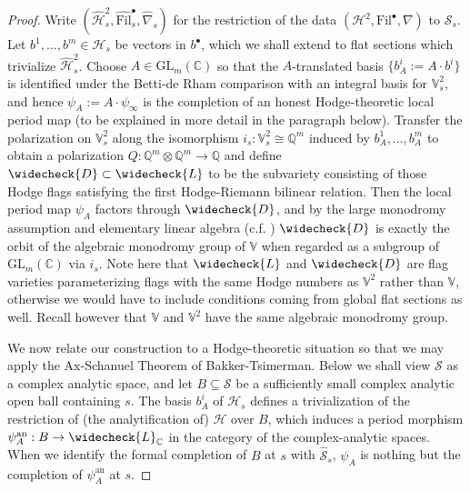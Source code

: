 \documentclass[letter, 11pt]{article}
\theoremstyle{plain}
\theoremstyle{definition}
\newcommand{\IC}{\mathbb{C}}
\newcommand{\IQ}{\mathbb{Q}}
\newcommand{\IV}{\mathbb{V}}
\newcommand{\che}[1]{\widecheck{#1}}
\newcommand{\<}{\langle}
\renewcommand{\>}{\rangle}
\newcommand{\sI}{\mathcal{I}}
\newcommand{\sH}{\mathcal{H}}
\newcommand{\sS}{\mathcal{S}}
\newcommand{\sP}{\mathcal{P}}
\newcommand{\Fil}{\mathrm{Fil}}
\newcommand{\GL}{\mathrm{GL}}
\begin{document}
\begin{proof}

Write $(\hat{\sH}^2_{s}, \hat{\Fil}^{\bullet}_{s}, \hat{\nabla}_{s})$ for the restriction of the data $(\sH^2, \Fil^{\bullet}, \nabla)$ to $\hat{\sS}_{s}$. Let $b^{1}, \hdots, b^{m} \in \sH_s$ be vectors in $b^\bullet$, which we shall extend to flat sections which trivialize $\hat{\sH}^2_{s}$. Choose $A \in \mathrm{GL}_m(\IC)$ so that the $A$-translated basis $\{ b^i_A := A \cdot b^i \}$ is identified under the Betti-de Rham comparison with an integral basis for $\IV^2_s$, and hence $\psi_{A} := A \cdot \psi_{\infty}$ is the completion of an honest Hodge-theoretic local period map (to be explained in more detail in the paragraph below). Transfer the polarization on $\mathbb{V}^2_s$ along the isomorphism $i_{s} : \IV^{2}_{s} \cong \IQ^{m}$ induced by $b^{1}_{A}, \hdots, b^{m}_{A}$ to obtain a polarization $Q : \IQ^{m} \otimes \IQ^{m} \to \IQ$ and define $\che{D} \subset \che{L}$ to be the subvariety consisting of those Hodge flags satisfying the first Hodge-Riemann bilinear relation. Then the local period map $\psi_A$ factors through $\che{D}$, and by the large monodromy assumption and elementary linear algebra (c.f. \cite[Ch.2, pg.48]{zbMATH06031035}) $\che{D}$ is exactly the orbit of the algebraic monodromy group of $\IV$ when regarded as a subgroup of $\GL_{m}(\IC)$ via $i_{s}$. Note here that $\che{L}$ and $\che{D}$ are flag varieties parameterizing flags with the same Hodge numbers as $\IV^{2}$ rather than $\IV$, otherwise we would have to include conditions coming from global flat sections as well. Recall however that $\IV$ and $\IV^2$ have the same algebraic monodromy group.

We now relate our construction to a Hodge-theoretic situation so that we may apply the Ax-Schanuel Theorem \cite{zbMATH07066495} of Bakker-Tsimerman. Below we shall view $\sS$ as a complex analytic space, and let $B \subseteq \sS$ be a sufficiently small complex analytic open ball containing $s$. The basis $b^i_A$ of $\sH_s$ defines a trivialization of the restriction of (the analytification of) $\sH$ over $B$, which induces a period morphism $\psi^{\mathrm{an}}_A : B \to \che{L}_\IC$ in the category of the complex-analytic spaces. When we identify the formal completion of $B$ at $s$ with $\hat{\sS}_s$, $\psi_A$ is nothing but the completion of $\psi^{\mathrm{an}}_A$ at $s$. 





\end{proof}
\end{document}
